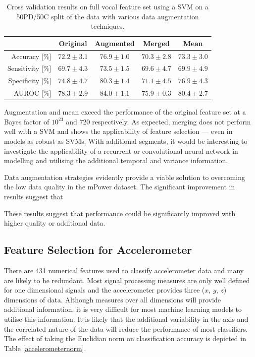 \documentclass[12pt, twoside]{book}
\begin{document}
\begin{table}[h]
	\caption{Cross validation results on full vocal feature set using a SVM on a 50PD/50C split of the data with various data augmentation techniques.}
	\label{speechboost}
	\centering
	\begin{tabular}{@{}rcccc@{}}
		&  Original & Augmented & Merged & Mean \\ \midrule
		Accuracy [\%]    &      $72.2\pm3.1$ &                       $76.9\pm1.0$                                  &     		$70.3\pm2.8$
		&						$73.3\pm3.0$\\ \midrule
		Sensitivity [\%] &       $69.7\pm4.3$ &                       $73.5\pm1.5$                                  &    		$69.6\pm4.7$
		&					    $69.9\pm4.9$\\ \midrule
		Specificity [\%] &      $74.8\pm4.7$ &                       $80.3\pm1.4$                                  &    		$71.1\pm4.5$
		&					    $76.9\pm4.3$\\ \midrule
		AUROC [\%]         &      $78.3\pm2.9$ &                       $84.0\pm1.1$                                  &     		$75.9\pm0.3$
		&				 		$80.4\pm2.7$\\ \midrule
	\end{tabular}
\end{table}

Augmentation and mean exceed the performance of the original feature set at a Bayes factor of $10^{23}$ and 720 respectively. As expected, merging does not perform well with a SVM and shows the applicability of feature selection --- even in models as robust as SVMs. With additional segments, it would be interesting to investigate the applicability of a recurrent or convolutional neural network in modelling and utilising the additional temporal and variance information.

Data augmentation strategies evidently provide a viable solution to overcoming the low data quality in the mPower dataset. The significant improvement in results suggest that 

These results suggest that performance could be significantly improved with higher quality or additional data. 



\subsection{Feature Selection for Accelerometer}
There are 431 numerical features used to classify accelerometer data and many are likely to be redundant. Most signal processing measures are only well defined for one dimensional signals and the accelerometer provides three ($x$, $y$, $z$) dimensions of data. Although measures over all dimensions will provide additional information, it is very difficult for most machine learning models to utilise this information. It is likely that the additional variability in the axis and the correlated nature of the data will reduce the performance of most classifiers. The effect of taking the Euclidian norm on classification accuracy is depicted in Table \ref{accelerometernorm}.
\end{document}
